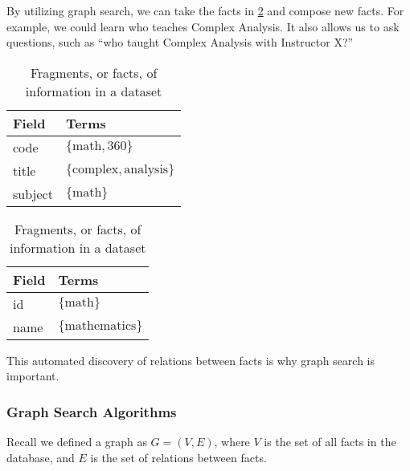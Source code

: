 			\begin{ex}
				By utilizing graph search, we can take the facts in \cref{tbl:facts} and compose new facts.  For example, we could learn who teaches Complex Analysis.  It also allows us to ask questions, such as ``who taught Complex Analysis with Instructor X?''
				
				\begin{table}
					\begin{subtable}[b]{0.5\linewidth}
						\centering
						
						\begin{tabular}{ll}
							\toprule
							Field & Terms \\
							\midrule
							code & \(\{\text{math}, \text{360}\}\) \\
							title & \(\{\text{complex}, \text{analysis}\}\) \\
							subject & \(\{\text{math}\}\) \\
							\bottomrule
						\end{tabular}
						
						\caption{Fact representing a Course}
						\label{subtbl:fact-course}
					\end{subtable}
					\begin{subtable}[b]{0.5\linewidth}
						\centering
						
						\begin{tabular}{ll}
							\toprule
							Field & Terms \\
							\midrule
							id & \(\{\text{math}\}\) \\
							name & \(\{\text{mathematics}\}\) \\
							\bottomrule
						\end{tabular}
						
						\caption{Fact representing a Subject}
						\label{subtbl:fact-subject}
					\end{subtable}
					
					\caption{Fragments, or facts, of information in a dataset}
					\label{tbl:facts}
				\end{table}
			\end{ex}
			
			This automated discovery of relations between facts is why graph search is important.
		
		\subsubsection{Graph Search Algorithms}
			Recall we defined a graph as \(G = (V, E)\), where \(V\) is the set of all facts in the database, and \(E\) is the set of relations between facts.
			
